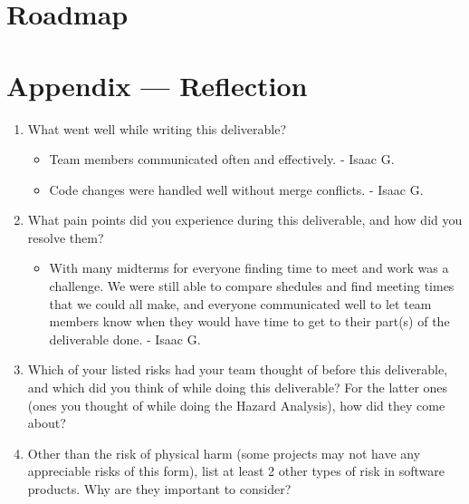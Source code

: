 \documentclass{article}
\begin{document}

\section{Roadmap}


\newpage{}

\section*{Appendix --- Reflection}




\begin{enumerate}
    \item What went well while writing this deliverable?

    \begin{itemize}
        \item Team members communicated often and effectively. - Isaac G.
        \item Code changes were handled well without merge conflicts. - Isaac G.
	\end{itemize}

    \item What pain points did you experience during this deliverable, and how
    did you resolve them?

    \begin{itemize}
        \item With many midterms for everyone finding time to meet and work was a challenge. We were still able to compare shedules and find meeting times that we could all make, and everyone communicated well to let team members know when they would have time to get to their part(s) of the deliverable done. - Isaac G.
	\end{itemize}

    \item Which of your listed risks had your team thought of before this
    deliverable, and which did you think of while doing this deliverable? For
    the latter ones (ones you thought of while doing the Hazard Analysis), how
    did they come about?
    \item Other than the risk of physical harm (some projects may not have any
    appreciable risks of this form), list at least 2 other types of risk in
    software products. Why are they important to consider?
\end{enumerate}
\end{document}
